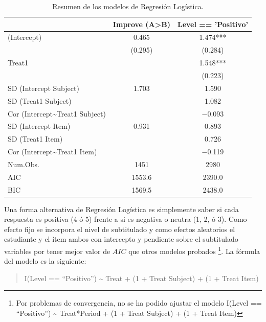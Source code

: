\documentclass[
  12pt,
  a4paper,
  extrafontsizes,
  onecolumn,
  openright,
  table]{memoir}
\begin{document}
\hypertarget{tbl-selected-logistic}{}
\begin{table}
\caption{\label{tbl-selected-logistic}Resumen de los modelos de Regresión Logística. }\tabularnewline

\centering
\begin{tabular}[t]{lcc}
\toprule
  & Improve (A>B) & Level == 'Positivo'\\
\midrule
(Intercept) & \num{0.465} & \num{1.474}***\\
 & (\num{0.295}) & (\num{0.284})\\
Treat1 &  & \num{1.548}***\\
 &  & (\num{0.223})\\
SD (Intercept Subject) & \num{1.703} & \num{1.590}\\
SD (Treat1 Subject) &  & \num{1.082}\\
Cor (Intercept\textasciitilde{}Treat1 Subject) &  & \num{-0.093}\\
SD (Intercept Item) & \num{0.931} & \num{0.893}\\
SD (Treat1 Item) &  & \num{0.726}\\
Cor (Intercept\textasciitilde{}Treat1 Item) &  & \num{-0.119}\\
\midrule
Num.Obs. & \num{1451} & \num{2980}\\
AIC & \num{1553.6} & \num{2390.0}\\
BIC & \num{1569.5} & \num{2438.0}\\
\bottomrule
\end{tabular}
\end{table}

Una forma alternativa de Regresión Logística es simplemente saber si
cada respuesta es positiva (4 ó 5) frente a si es negativa o neutra (1,
2, ó 3). Como efecto fijo se incorpora el nivel de subtitulado y como
efectos aleatorios el estudiante y el ítem ambos con intercepto y
pendiente sobre el subtitulado variables por tener mejor valor de
\(AIC\) que otros modelos probados \footnote{Por problemas de
  convergencia, no se ha podido ajustar el modelo I(Level ==
  \enquote{Positivo}) \textasciitilde{} Treat*Period + (1 + Treat
  \textbar{} Subject) + (1 + Treat \textbar{} Item)}. La fórmula del
modelo es la siguiente:

\small

\begin{quote}
I(Level == \enquote{Positivo}) \textasciitilde{} Treat + (1 + Treat
\textbar{} Subject) + (1 + Treat \textbar{} Item)
\end{quote}
\end{document}
